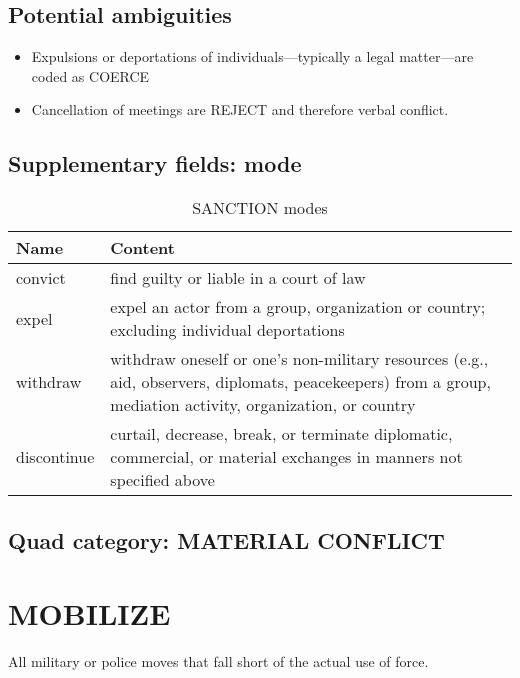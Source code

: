 \documentclass[11pt]{report}
\newcommand{\plcat}[1]{\textsf{#1}}
\begin{document}
\subsection{Potential ambiguities}

\begin{itemize}
\item Expulsions or deportations of individuals---typically a legal matter---are coded as \plcat{COERCE} 
\item Cancellation of meetings are \plcat{REJECT} and therefore verbal conflict.
\end{itemize}

\subsection{Supplementary fields: mode}

\begin{table}[htp]
\caption{SANCTION modes}
\begin{center}
\begin{tabular}{|l|p{13cm}|}
\hline
Name & Content \\
\hline
convict & find guilty or liable in a court of law\\
expel & expel an actor from a group, organization or country; excluding individual deportations \\
withdraw & withdraw oneself or one's non-military resources (e.g., aid, observers, diplomats, peacekeepers) from a group, mediation activity, organization, or country\\
discontinue & curtail, decrease, break, or terminate diplomatic, commercial, or material exchanges in manners not specified above \\
\hline
\end{tabular}
\end{center}
\label{tab:sanctionmode}
\end{table}%

\subsection{Quad category: MATERIAL CONFLICT}

\newpage  

\section{MOBILIZE}

All military or police moves that fall short of the actual use of force. 
\end{document}
